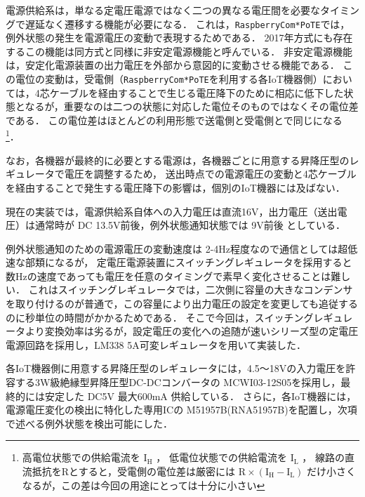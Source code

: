 {電源供給系は，単なる定電圧電源ではなく二つの異なる電圧間を必要なタイミングで遅延なく遷移する機能が必要になる．
これは，{\tt Raspberry\-Com*PoTE}では，例外状態の発生を電源電圧の変動で表現するためである．
2017年方式にも存在するこの機能は同方式と同様に非安定電源機能と呼んでいる．
非安定電源機能は，安定化電源装置の出力電圧を外部から意図的に変動させる機能である．
この電位の変動は，受電側（{\tt Raspberry\-Com*PoTE}を利用する各IoT機器側）においては，4芯ケーブルを経由することで生じる電圧降下のために相応に低下した状態となるが，重要なのは二つの状態に対応した電位そのものではなくその電位差である．
この電位差はほとんどの利用形態で送電側と受電側とで同じになる
\footnote{高電位状態での供給電流を $\text{I}_\text{H}$ ，
  低電位状態での供給電流を $\text{I}_\text{L}$ ，
  線路の直流抵抗をRとすると，受電側の電位差は厳密には
  $ \text{R} \times (\text{I}_\text{H} - \text{I}_\text{L}) $
  だけ小さくなるが，この差は今回の用途にとっては十分に小さい}．

なお，各機器が最終的に必要とする電源は，各機器ごとに用意する昇降圧型のレギュレータで電圧を調整するため，
送出時点での電源電圧の変動と4芯ケーブルを経由することで発生する電圧降下の影響は，個別のIoT機器には及ばない．

現在の実装では，電源供給系自体への入力電圧は直流16V，出力電圧（送出電圧）は通常時が DC 13.5V前後，例外状態通知状態では 9V前後 としている．

例外状態通知のための電源電圧の変動速度は 2-4Hz程度なので通信としては超低速な部類になるが，
定電圧電源装置にスイッチングレギュレータを採用すると数Hzの速度であっても電圧を任意のタイミングで素早く変化させることは難しい．
これはスイッチングレギュレータでは，二次側に容量の大きなコンデンサを取り付けるのが普通で，この容量により出力電圧の設定を変更しても追従するのに秒単位の時間がかかるためである．
そこで今回は，スイッチングレギュレータより変換効率は劣るが，設定電圧の変化への追随が速いシリーズ型の定電圧電源回路を採用し，LM338 5A可変レギュレータ\cite{data:LM338}を用いて実装した．



各IoT機器側に用意する昇降圧型のレギュレータには，4.5〜18Vの入力電圧を許容する3W級絶縁型昇降圧型DC-DCコンバータの MCWI03-12S05\cite{data:MCWI03-12S05}を採用し，最終的には安定した DC5V 最大600mA 供給している．
さらに，各IoT機器には，電源電圧変化の検出に特化した専用ICの M51957B(RNA51957B)\cite{data:M51957B}を配置し，次項で述べる例外状態を検出可能にした．

}
